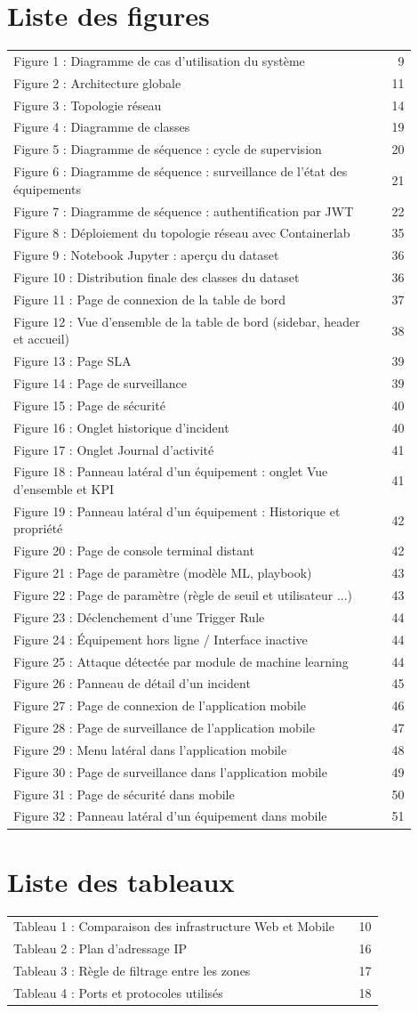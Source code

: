 \documentclass[12pt,a4paper]{report}
\newcommand{\tocrow}[2]{#1 \dotfill & #2\\}
\begin{document}
\section*{Liste des figures}
\begingroup\small\setlength{\tabcolsep}{0pt}\renewcommand{\arraystretch}{1.08}
\begin{longtable}{@{}p{0.90\linewidth}@{\hspace{0.5cm}}r@{}}
\tocrow{Figure 1 : Diagramme de cas d'utilisation du système}{9}
\tocrow{Figure 2 : Architecture globale}{11}
\tocrow{Figure 3 : Topologie réseau}{14}
\tocrow{Figure 4 : Diagramme de classes}{19}
\tocrow{Figure 5 : Diagramme de séquence : cycle de supervision}{20}
\tocrow{Figure 6 : Diagramme de séquence : surveillance de l'état des équipements}{21}
\tocrow{Figure 7 : Diagramme de séquence : authentification par JWT}{22}
\tocrow{Figure 8 : Déploiement du topologie réseau avec Containerlab}{35}
\tocrow{Figure 9 : Notebook Jupyter : aperçu du dataset}{36}
\tocrow{Figure 10 : Distribution finale des classes du dataset}{36}
\tocrow{Figure 11 : Page de connexion de la table de bord}{37}
\tocrow{Figure 12 : Vue d'ensemble de la table de bord (sidebar, header et accueil)}{38}
\tocrow{Figure 13 : Page SLA}{39}
\tocrow{Figure 14 : Page de surveillance}{39}
\tocrow{Figure 15 : Page de sécurité}{40}
\tocrow{Figure 16 : Onglet historique d'incident}{40}
\tocrow{Figure 17 : Onglet Journal d’activité}{41}
\tocrow{Figure 18 : Panneau latéral d'un équipement : onglet Vue d’ensemble et KPI}{41}
\tocrow{Figure 19 : Panneau latéral d'un équipement : Historique et propriété}{42}
\tocrow{Figure 20 : Page de console terminal distant}{42}
\tocrow{Figure 21 : Page de paramètre (modèle ML, playbook)}{43}
\tocrow{Figure 22 : Page de paramètre (règle de seuil et utilisateur ...)}{43}
\tocrow{Figure 23 : Déclenchement d’une Trigger Rule}{44}
\tocrow{Figure 24 : Équipement hors ligne / Interface inactive}{44}
\tocrow{Figure 25 : Attaque détectée par module de machine learning}{44}
\tocrow{Figure 26 : Panneau de détail d’un incident}{45}
\tocrow{Figure 27 : Page de connexion de l'application mobile}{46}
\tocrow{Figure 28 : Page de surveillance de l'application mobile}{47}
\tocrow{Figure 29 : Menu latéral dans l'application mobile}{48}
\tocrow{Figure 30 : Page de surveillance dans l'application mobile}{49}
\tocrow{Figure 31 : Page de sécurité dans mobile}{50}
\tocrow{Figure 32 : Panneau latéral d'un équipement dans mobile}{51}
\end{longtable}
\endgroup
\clearpage
\section*{Liste des tableaux}
\begingroup\small\setlength{\tabcolsep}{0pt}\renewcommand{\arraystretch}{1.08}
\begin{longtable}{@{}p{0.90\linewidth}@{\hspace{0.5cm}}r@{}}
\tocrow{Tableau 1 : Comparaison des infrastructure Web et Mobile}{10}
\tocrow{Tableau 2 : Plan d'adressage IP}{16}
\tocrow{Tableau 3 : Règle de filtrage entre les zones}{17}
\tocrow{Tableau 4 : Ports et protocoles utilisés}{18}
\end{longtable}
\endgroup
\clearpage
\end{document}
